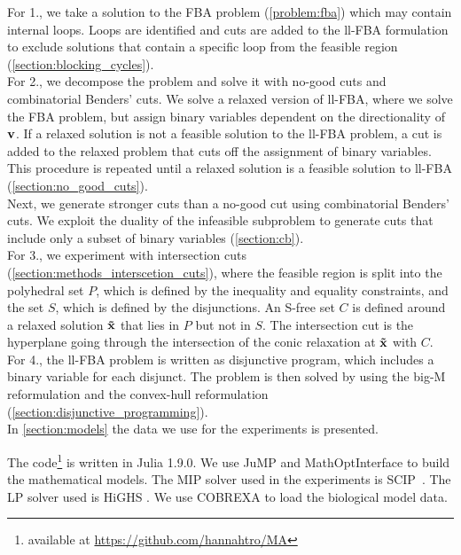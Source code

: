 For 1., we take a solution to the \textsf{FBA} problem (\cref{problem:fba}) which may contain internal loops. Loops are identified and cuts are added to the \textsf{ll-FBA} formulation to exclude solutions that contain a specific loop from the feasible region (\cref{section:blocking_cycles}). \\
For 2., we decompose the problem and solve it with no-good cuts and combinatorial Benders' cuts.
We solve a relaxed version of \textsf{ll-FBA}, where we solve the \textsf{FBA} problem, but assign binary variables dependent on the directionality of $\bold v$. If a relaxed solution is not a feasible solution to the \textsf{ll-FBA} problem, a cut is added to the relaxed problem that cuts off the assignment of binary variables. This procedure is repeated until a relaxed solution is a feasible solution to \textsf{ll-FBA} (\cref{section:no_good_cuts}). \\
Next, we generate stronger cuts than a no-good cut using combinatorial Benders' cuts. We exploit the duality of the infeasible subproblem to generate cuts that include only a subset of binary variables (\cref{section:cb}). \\
For 3., we experiment with intersection cuts (\cref{section:methods_interscetion_cuts}), where the feasible region is split into the polyhedral set $P$, which is defined by the inequality and equality constraints, and the set $S$, which is defined by the disjunctions. An S-free set $C$ is defined around a relaxed solution $\bold{\tilde x}$ that lies in $P$ but not in $S$. The intersection cut is the hyperplane going through the intersection of the conic relaxation at $\bold{\tilde x}$ with $C$. \\
For 4., the \textsf{ll-FBA} problem is written as disjunctive program, which includes a binary variable for each disjunct. The problem is then solved by using the big-M reformulation and the convex-hull reformulation (\cref{section:disjunctive_programming}). \\
In \cref{section:models} the data we use for the experiments is presented.

The code\footnote{available at \url{https://github.com/hannahtro/MA}} is written in \textsf{Julia} 1.9.0. We use \textsf{JuMP} \cite{JuMP} and \textsf{MathOptInterface} \cite{mathoptinterface} to build the mathematical models. The MIP solver used in the experiments is \textsf{SCIP}~\cite{SCIP}. The LP solver used is \textsf{HiGHS} \cite{HiGHS}. We use \textsf{COBREXA} \cite{cobrexa} to load the biological model data.


